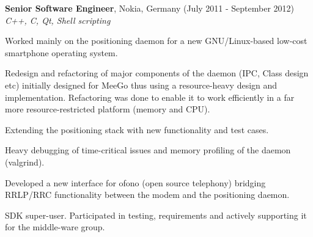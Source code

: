 \documentclass[alan.tex]{subfiles}
\begin{document}
\item \textbf{Senior Software Engineer}, Nokia, Germany (July 2011 - September 2012)\\
  \emph{C++, C, Qt, Shell scripting}
  \begin{my_desc}
    \item[Worked] mainly on the positioning daemon for a new GNU/Linux-based low-cost smartphone operating system.
      \begin{my_bullets}
        \item Redesign and refactoring of major components of the daemon (IPC, Class design etc) initially designed for MeeGo thus using a resource-heavy design and implementation. Refactoring was done to enable it to work efficiently in a far more resource-restricted platform (memory and CPU).
        \item Extending the positioning stack with new functionality and test cases.
        \item Heavy debugging of time-critical issues and memory profiling of the daemon (valgrind).
      \end{my_bullets}
    \item[Developed] a new interface for ofono (open source telephony) bridging RRLP/RRC functionality between the modem and the positioning daemon.
    \item[SDK] super-user. Participated in testing, requirements and actively supporting it for the middle-ware group.
  \end{my_desc}
\end{document}
